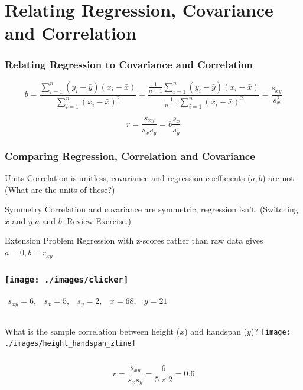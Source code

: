 \section{Relating Regression, Covariance and Correlation}
\begin{frame}
	\frametitle{Relating Regression to Covariance and Correlation}
		$$b = \frac{\sum_{i=1}^n \left(y_i - \bar{y}\right)\left(x_i - \bar{x} \right)}{\sum_{i=1}^n \left(x_i - \bar{x}\right)^2} = \frac{\frac{1}{n-1}\sum_{i=1}^n \left(y_i - \bar{y}\right)\left(x_i - \bar{x} \right)}{\frac{1}{n-1}\sum_{i=1}^n \left(x_i - \bar{x}\right)^2} = \frac{s_{xy}}{s_x^2}$$
		
		$$r = \frac{s_{xy}}{s_x s_y} = b \frac{s_x}{s_y}$$
		
\end{frame}
\begin{frame}
\frametitle{Comparing Regression, Correlation and Covariance}

\begin{block}{Units}
Correlation is unitless, covariance and regression coefficients ($a, b$) are not. (What are the units of these?)
\end{block}


\begin{block}{Symmetry}
Correlation and covariance are symmetric, regression isn't. (Switching $x$ and $y$  $a$ and $b$: Review Exercise.)
\end{block}

\begin{block}{Extension Problem}
Regression with z-scores rather than raw data gives $a=0, b = r_{xy}$
\end{block}

\end{frame}

\begin{frame}
\frametitle{\texttt{[image: ./images/clicker]}}
$\begin{array}{ccccc} s_{xy} = 6,&s_x = 5,& s_y = 2,& \bar{x} = 68,& \bar{y} = 21\end{array}$
\begin{columns}[c]
\column{2.5in}
What is the sample correlation between height ($x$) and handspan ($y$)?
\column{1.8in}
\texttt{[image: ./images/height\_handspan\_zline]}
\end{columns}

\pause

\alert{$$r = \frac{s_{xy}}{s_x s_y} = \frac{6}{5\times 2} = 0.6$$}
\end{frame}

